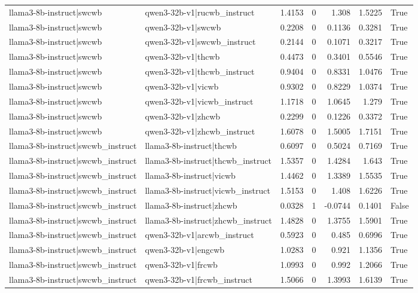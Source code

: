 \begin{table}
\begin{tabular}{l l r r r r l}
llama3-8b-instruct|swcwb & qwen3-32b-v1|rucwb_instruct & 1.4153 & 0 & 1.308 & 1.5225 & True \\
llama3-8b-instruct|swcwb & qwen3-32b-v1|swcwb & 0.2208 & 0 & 0.1136 & 0.3281 & True \\
llama3-8b-instruct|swcwb & qwen3-32b-v1|swcwb_instruct & 0.2144 & 0 & 0.1071 & 0.3217 & True \\
llama3-8b-instruct|swcwb & qwen3-32b-v1|thcwb & 0.4473 & 0 & 0.3401 & 0.5546 & True \\
llama3-8b-instruct|swcwb & qwen3-32b-v1|thcwb_instruct & 0.9404 & 0 & 0.8331 & 1.0476 & True \\
llama3-8b-instruct|swcwb & qwen3-32b-v1|vicwb & 0.9302 & 0 & 0.8229 & 1.0374 & True \\
llama3-8b-instruct|swcwb & qwen3-32b-v1|vicwb_instruct & 1.1718 & 0 & 1.0645 & 1.279 & True \\
llama3-8b-instruct|swcwb & qwen3-32b-v1|zhcwb & 0.2299 & 0 & 0.1226 & 0.3372 & True \\
llama3-8b-instruct|swcwb & qwen3-32b-v1|zhcwb_instruct & 1.6078 & 0 & 1.5005 & 1.7151 & True \\
llama3-8b-instruct|swcwb_instruct & llama3-8b-instruct|thcwb & 0.6097 & 0 & 0.5024 & 0.7169 & True \\
llama3-8b-instruct|swcwb_instruct & llama3-8b-instruct|thcwb_instruct & 1.5357 & 0 & 1.4284 & 1.643 & True \\
llama3-8b-instruct|swcwb_instruct & llama3-8b-instruct|vicwb & 1.4462 & 0 & 1.3389 & 1.5535 & True \\
llama3-8b-instruct|swcwb_instruct & llama3-8b-instruct|vicwb_instruct & 1.5153 & 0 & 1.408 & 1.6226 & True \\
llama3-8b-instruct|swcwb_instruct & llama3-8b-instruct|zhcwb & 0.0328 & 1 & -0.0744 & 0.1401 & False \\
llama3-8b-instruct|swcwb_instruct & llama3-8b-instruct|zhcwb_instruct & 1.4828 & 0 & 1.3755 & 1.5901 & True \\
llama3-8b-instruct|swcwb_instruct & qwen3-32b-v1|arcwb_instruct & 0.5923 & 0 & 0.485 & 0.6996 & True \\
llama3-8b-instruct|swcwb_instruct & qwen3-32b-v1|engcwb & 1.0283 & 0 & 0.921 & 1.1356 & True \\
llama3-8b-instruct|swcwb_instruct & qwen3-32b-v1|frcwb & 1.0993 & 0 & 0.992 & 1.2066 & True \\
llama3-8b-instruct|swcwb_instruct & qwen3-32b-v1|frcwb_instruct & 1.5066 & 0 & 1.3993 & 1.6139 & True \\

\end{tabular}
\end{table}
